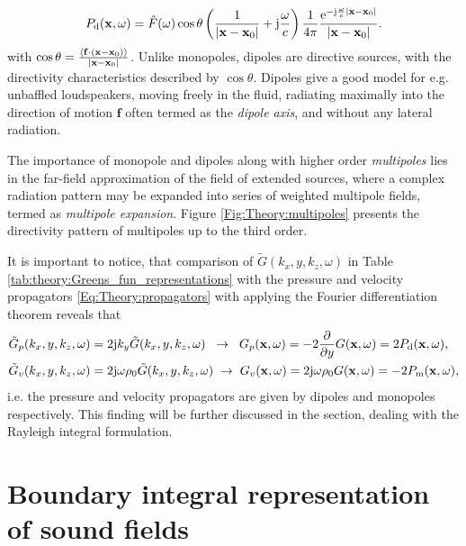 \begin{itemize}
\begin{equation}
P_{\mathrm{d}}(\mathbf{x},\omega) =  \hat{F}(\omega)
\cos \theta \left(  \frac{1}{|\mathbf{x}-\mathbf{x}_0|} + \mathrm{j} \frac{\omega}{c} \right)
\frac{1}{4\pi}
\frac{\mathrm{e}^{-\mathrm{j} \frac{\omega}{c}|\mathbf{x}-\mathbf{x}_0|}}{|\mathbf{x}-\mathbf{x}_0|}.
\end{equation}
with $\cos \theta = \frac{\left<\mathbf{f} \cdot (\mathbf{x}-\mathbf{x}_0) \right> } {|\mathbf{x}-\mathbf{x}_0|}$.
Unlike monopoles, dipoles are directive sources, with the directivity characteristics described by $\cos \theta$.
Dipoles give a good model for e.g. unbaffled loudspeakers, moving freely in the fluid, radiating maximally into the direction of motion $\mathbf{f}$ often termed as the \emph{dipole axis}, and without any lateral radiation.
%
\end{itemize}
The importance of monopole and dipoles along with higher order \emph{multipoles} lies in the far-field approximation of the field of extended sources,
where a complex radiation pattern may be expanded into series of weighted multipole fields, termed as \emph{multipole expansion}.
Figure \ref{Fig:Theory:multipoles} presents the directivity pattern of multipoles up to the third order.

\vspace{3mm}
It is important to notice, that comparison of $\tilde{G}(k_x,y,k_z,\omega)$ in Table \ref{tab:theory:Greens_fun_representations}  with the pressure and velocity propagators \eqref{Eq:Theory:propagators} with applying the Fourier differentiation theorem reveals that
\begin{align}
\tilde{G}_p(k_x,y,k_z,\omega) &=  2 \mathrm{j} k_y \tilde{G}(k_x,y,k_z,\omega) 
\hspace{2mm} \rightarrow \hspace{2mm} 
G_p(\mathbf{x},\omega) = -2 \frac{\partial}{\partial y} G(\mathbf{x},\omega) = 2 P_{\mathrm{d}}(\mathbf{x},\omega),
\\
\tilde{G}_v(k_x,y,k_z,\omega) &=  2 \mathrm{j} \omega \rho_0 \tilde{G}(k_x,y,k_z,\omega) 
\hspace{1mm} \rightarrow \hspace{1mm} 
G_v(\mathbf{x},\omega) = 2 \mathrm{j} \omega \rho_0 G(\mathbf{x},\omega) = -2P_{\mathrm{m}}(\mathbf{x},\omega),
\end{align}
i.e. the pressure and velocity propagators are given by dipoles and monopoles respectively.
This finding will be further discussed in the section, dealing with the Rayleigh integral formulation.

\newpage
\section{Boundary integral representation of sound fields}

